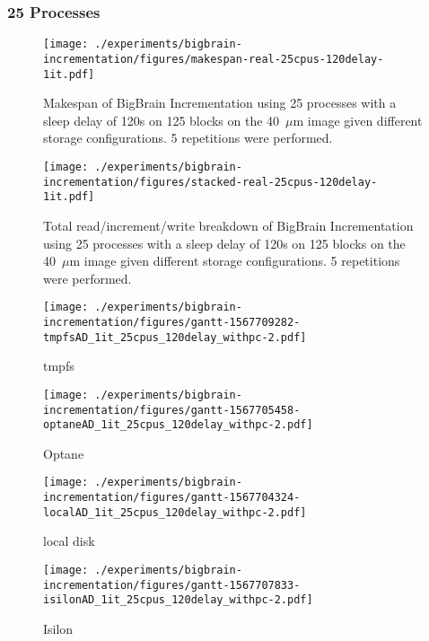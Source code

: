 \documentclass[conference]{IEEEtran}
\newcommand{\bigbrain}{BigBrain\xspace}
\begin{document}
\subsubsection{25 Processes}
\begin{figure}
    \texttt{[image: ./experiments/bigbrain-incrementation/figures/makespan-real-25cpus-120delay-1it.pdf]}
    \captionsetup{width=\columnwidth}
    \caption{Makespan of \bigbrain Incrementation using 25 processes with a sleep delay of 120s on 125 blocks on the 40~$\mu$m image given different storage configurations. 5 repetitions were performed.}\label{fig:makespan-25cpus}
\end{figure}
\begin{figure}
    \texttt{[image: ./experiments/bigbrain-incrementation/figures/stacked-real-25cpus-120delay-1it.pdf]}
    \captionsetup{width=\columnwidth}
    \caption{Total read/increment/write breakdown of \bigbrain Incrementation using 25 processes with a sleep delay of 120s on 125 blocks on the 40~$\mu$m image given different storage configurations. 5 repetitions were performed.}\label{fig:stacked-25cpus}
\end{figure}
\begin{figure*}
    \begin{subfigure}{\columnwidth}
        \centering
    \texttt{[image: ./experiments/bigbrain-incrementation/figures/gantt-1567709282-tmpfsAD\_1it\_25cpus\_120delay\_withpc-2.pdf]}
    \caption{tmpfs}
\end{subfigure}
\begin{subfigure}{\columnwidth}
        \centering
    \texttt{[image: ./experiments/bigbrain-incrementation/figures/gantt-1567705458-optaneAD\_1it\_25cpus\_120delay\_withpc-2.pdf]}
    \caption{Optane}
\end{subfigure}
\begin{subfigure}{\columnwidth}
        \centering
    \texttt{[image: ./experiments/bigbrain-incrementation/figures/gantt-1567704324-localAD\_1it\_25cpus\_120delay\_withpc-2.pdf]}
    \caption{local disk}
\end{subfigure}
\begin{subfigure}{\columnwidth}
        \centering
    \texttt{[image: ./experiments/bigbrain-incrementation/figures/gantt-1567707833-isilonAD\_1it\_25cpus\_120delay\_withpc-2.pdf]}
    \caption{Isilon}\label{fig:gantt25isilon}
\end{subfigure}
\caption{Gantt charts for each storage device (App Direct Mode) processing 125 blocks of the 40$\mu$m BigBrain using 25 processes and a sleep delay of 120s}\label{fig:gantt25}
\end{figure*}
\end{document}
